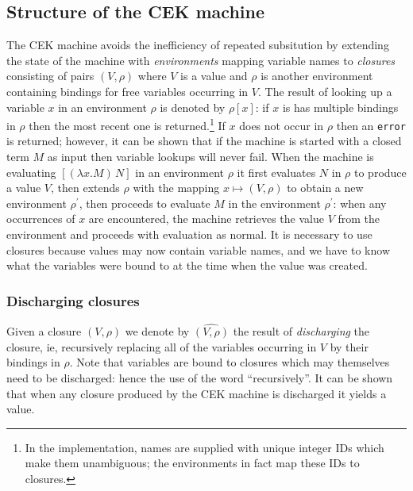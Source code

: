 \documentclass[a4paper]{article}
\newcommand\discharge[1]{\widehat{#1}}
\begin{document}
\begin{appendices}
\subsection{Structure of the CEK machine}
The CEK machine avoids the inefficiency of repeated subsitution by
extending the state of the machine with
\textit{environments} mapping variable names to \textit{closures} consisting of
pairs $(V,\rho)$ where $V$ is a value and $\rho$ is another
environment containing bindings for free variables occurring in $V$.
The result of looking up a variable $x$ in an environment $\rho$ is
denoted by $\rho[x]$: if $x$ is has multiple bindings in $\rho$ then
the most recent one is returned.\footnote{In the implementation, names
are supplied with unique integer IDs which make them unambiguous; the
environments in fact map these IDs to closures.} If $x$ does not occur
in $\rho$ then an \texttt{error} is returned; however, it can be shown
that if the machine is started with a closed term $M$ as input then
variable lookups will never fail.  When the machine is evaluating
$[(\lambda x.M)\, N]$ in an environment $\rho$ it first evaluates $N$
in $\rho$ to produce a value $V$, then extends $\rho$ with the mapping
$x \mapsto (V,\rho)$ to obtain a new environment $\rho^{\prime}$, then
proceeds to evaluate $M$ in the environment $\rho^\prime$: when any
occurrences of $x$ are encountered, the machine retrieves the value
$V$ from the environment and proceeds with evaluation as normal.  It
is necessary to use closures because values may now contain variable
names, and we have to know what the variables were bound to at the
time when the value was created.

\subsubsection{Discharging closures}
Given a closure $(V,\rho)$ we denote by $\discharge{(V,\rho)}$ the
result of \textit{discharging} the closure, ie, recursively replacing
all of the variables occurring in $V$ by their bindings in
$\rho$. Note that variables are bound to closures which may themselves
need to be discharged: hence the use of the word ``recursively''. It
can be shown that when any closure produced by the CEK machine is
discharged it yields a value.


\end{appendices}
\end{document}
